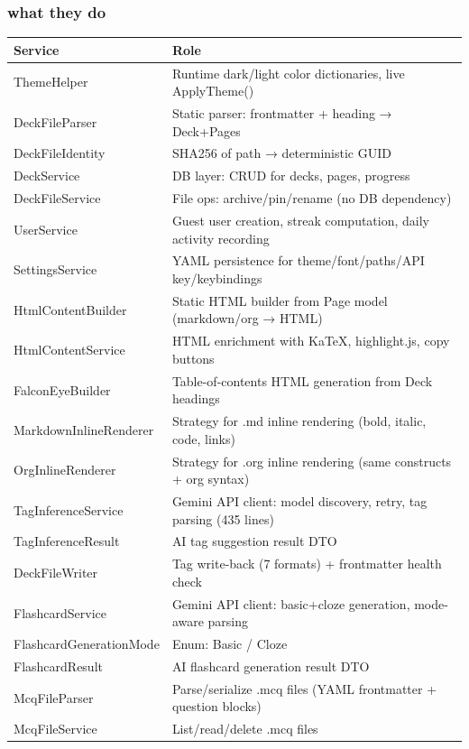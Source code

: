 \documentclass[14pt]{article}
\begin{document}
\newpage
\subsubsection{what they do}
\label{sec:orgeb04248}
\begin{center}
\begin{tabular}{ll}
Service & Role\\
\hline
ThemeHelper & Runtime dark/light color dictionaries, live ApplyTheme()\\
DeckFileParser & Static parser: frontmatter + heading → Deck+Pages\\
DeckFileIdentity & SHA256 of path → deterministic GUID\\
DeckService & DB layer: CRUD for decks, pages, progress\\
DeckFileService & File ops: archive/pin/rename (no DB dependency)\\
UserService & Guest user creation, streak computation, daily activity recording\\
SettingsService & YAML persistence for theme/font/paths/API key/keybindings\\
HtmlContentBuilder & Static HTML builder from Page model (markdown/org → HTML)\\
HtmlContentService & HTML enrichment with KaTeX, highlight.js, copy buttons\\
FalconEyeBuilder & Table-of-contents HTML generation from Deck headings\\
MarkdownInlineRenderer & Strategy for .md inline rendering (bold, italic, code, links)\\
OrgInlineRenderer & Strategy for .org inline rendering (same constructs + org syntax)\\
TagInferenceService & Gemini API client: model discovery, retry, tag parsing (435 lines)\\
TagInferenceResult & AI tag suggestion result DTO\\
DeckFileWriter & Tag write-back (7 formats) + frontmatter health check\\
FlashcardService & Gemini API client: basic+cloze generation, mode-aware parsing\\
FlashcardGenerationMode & Enum: Basic / Cloze\\
FlashcardResult & AI flashcard generation result DTO\\
McqFileParser & Parse/serialize .mcq files (YAML frontmatter + question blocks)\\
McqFileService & List/read/delete .mcq files\\

\end{tabular}
\end{center}
\end{document}

